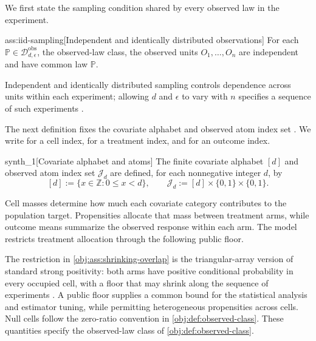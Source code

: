 \documentclass[11pt]{article}
\begin{document}
We first state the sampling condition shared by every observed law in the experiment.

\begin{assumptionv}{ass:iid-sampling}[Independent and identically distributed observations]
For each \(\mathbb P\in\mathcal D_{d,\epsilon}^{\mathrm{obs}}\), the observed-law class, the observed units \(O_1,\ldots,O_n\) are independent and have common law \(\mathbb P\).
\end{assumptionv}

Independent and identically distributed sampling controls dependence across units within each experiment; allowing \(d\) and \(\epsilon\) to vary with \(n\) specifies a sequence of such experiments \citep{ZengBalakrishnanHanKennedy2024Discrete}.

The next definition fixes the covariate alphabet  and observed atom index set . We write  for a cell index,  for a treatment index, and  for an outcome index.

\begin{definitionv}{synth_1}[Covariate alphabet and atoms]
The finite covariate alphabet \([d]\) and observed atom index set \(\mathcal J_d\) are defined, for each nonnegative integer \(d\), by
\[
[d] := \{x\in\mathbb Z : 0\le x<d\},
\qquad
\mathcal J_d := [d]\times\{0,1\}\times\{0,1\}.
\]
\end{definitionv}

Cell masses determine how much each covariate category contributes to the population target. Propensities allocate that mass between treatment arms, while outcome means summarize the observed response within each arm. The model restricts treatment allocation through the following public floor.

The restriction in \cref{obj:ass:shrinking-overlap} is the triangular-array version of standard strong positivity: both arms have positive conditional probability in every occupied cell, with a floor that may shrink along the sequence of experiments \citep{ZengBalakrishnanHanKennedy2024Discrete}. A public floor supplies a common bound for the statistical analysis and estimator tuning, while permitting heterogeneous propensities across cells. Null cells follow the zero-ratio convention in \cref{obj:def:observed-class}. These quantities specify the observed-law class  of \cref{obj:def:observed-class}.
\end{document}
